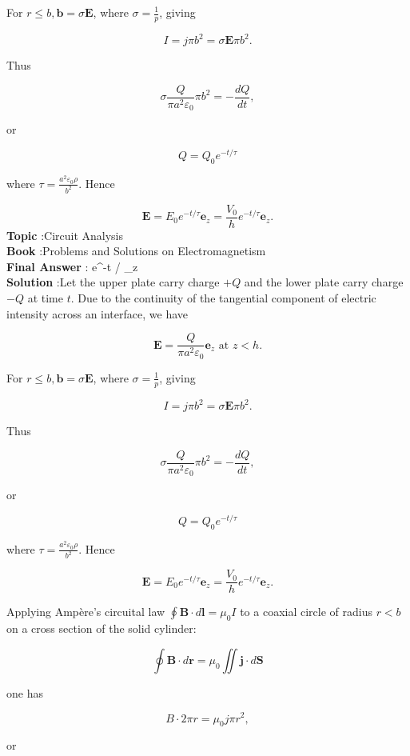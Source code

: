 \documentclass[10pt]{article}
\begin{document}
For $r \leq b, \mathbf{b}=\sigma \mathbf{E}$, where $\sigma=\frac{1}{p}$, giving

$$
I=j \pi b^{2}=\sigma \mathbf{E} \pi b^{2} .
$$

Thus

$$
\sigma \frac{Q}{\pi a^{2} \varepsilon_{0}} \pi b^{2}=-\frac{d Q}{d t},
$$

or

$$
Q=Q_{0} e^{-t / \tau}
$$

where $\tau=\frac{a^{2} \varepsilon_{0} \rho}{b^{2}}$. Hence

$$
\mathbf{E}=E_{0} e^{-t / \tau} \mathbf{e}_{z}=\frac{V_{0}}{h} e^{-t / \tau} \mathbf{e}_{z} .
$$
\textbf{Topic} :Circuit Analysis\\
\textbf{Book} :Problems and Solutions on Electromagnetism\\
\textbf{Final Answer} : e^{-t / \tau} _{z}\\


\textbf{Solution} :Let the upper plate carry charge $+Q$ and the lower plate carry charge $-Q$ at time $t$. Due to the continuity of the tangential component of electric intensity across an interface, we have

$$
\mathbf{E}=\frac{Q}{\pi a^{2} \varepsilon_{0}} \mathbf{e}_{z} \text { at } z<h .
$$

For $r \leq b, \mathbf{b}=\sigma \mathbf{E}$, where $\sigma=\frac{1}{p}$, giving

$$
I=j \pi b^{2}=\sigma \mathbf{E} \pi b^{2} .
$$

Thus

$$
\sigma \frac{Q}{\pi a^{2} \varepsilon_{0}} \pi b^{2}=-\frac{d Q}{d t},
$$

or

$$
Q=Q_{0} e^{-t / \tau}
$$

where $\tau=\frac{a^{2} \varepsilon_{0} \rho}{b^{2}}$. Hence

$$
\mathbf{E}=E_{0} e^{-t / \tau} \mathbf{e}_{z}=\frac{V_{0}}{h} e^{-t / \tau} \mathbf{e}_{z} .
$$

 Applying Ampère's circuital law $\oint \mathbf{B} \cdot d \mathbf{l}=\mu_{0} I$ to a coaxial circle of radius $r<b$ on a cross section of the solid cylinder:

$$
\oint \mathbf{B} \cdot d \mathbf{r}=\mu_{0} \iint \mathbf{j} \cdot d \mathbf{S}
$$

one has

$$
B \cdot 2 \pi r=\mu_{0} j \pi r^{2},
$$

or
\end{document}
